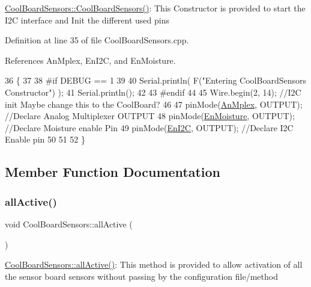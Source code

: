 \hyperlink{classCoolBoardSensors_a91ff2a02f5486f90cf2413a1cf8a9ed4}{Cool\+Board\+Sensors\+::\+Cool\+Board\+Sensors()}\+: This Constructor is provided to start the I2C interface and Init the different used pins 

Definition at line 35 of file Cool\+Board\+Sensors.\+cpp.



References An\+Mplex, En\+I2C, and En\+Moisture.


\begin{DoxyCode}
36 \{
37 
38 \textcolor{preprocessor}{#if DEBUG == 1}
39 
40     Serial.println( F(\textcolor{stringliteral}{"Entering CoolBoardSensors Constructor"}) );
41     Serial.println();
42 
43 \textcolor{preprocessor}{#endif}
44     
45     Wire.begin(2, 14);                       \textcolor{comment}{//I2C init Maybe change this to the CoolBoard?}
46 
47     pinMode(\hyperlink{classCoolBoardSensors_a12ef28b1046219e0aee10bf64e28c4a5}{AnMplex}, OUTPUT);                \textcolor{comment}{//Declare Analog Multiplexer OUTPUT}
48     pinMode(\hyperlink{classCoolBoardSensors_a6177d02e14a057a2f171a2e930b5038d}{EnMoisture}, OUTPUT);             \textcolor{comment}{//Declare Moisture enable Pin}
49     pinMode(\hyperlink{classCoolBoardSensors_aaa6b5dbf3a6633bffd9d204d961096dc}{EnI2C}, OUTPUT);           \textcolor{comment}{//Declare I2C Enable pin }
50 
51 
52 \}
\end{DoxyCode}


\subsection{Member Function Documentation}
\mbox{\label{classCoolBoardSensors_aa432c5aac88f89c31a10766390f23e0b}} 
\subsubsection{\texorpdfstring{all\+Active()}{allActive()}}
{\footnotesize\ttfamily void Cool\+Board\+Sensors\+::all\+Active (\begin{DoxyParamCaption}{ }\end{DoxyParamCaption})}

\hyperlink{classCoolBoardSensors_aa432c5aac88f89c31a10766390f23e0b}{Cool\+Board\+Sensors\+::all\+Active()}\+: This method is provided to allow activation of all the sensor board sensors without passing by the configuration file/method 

